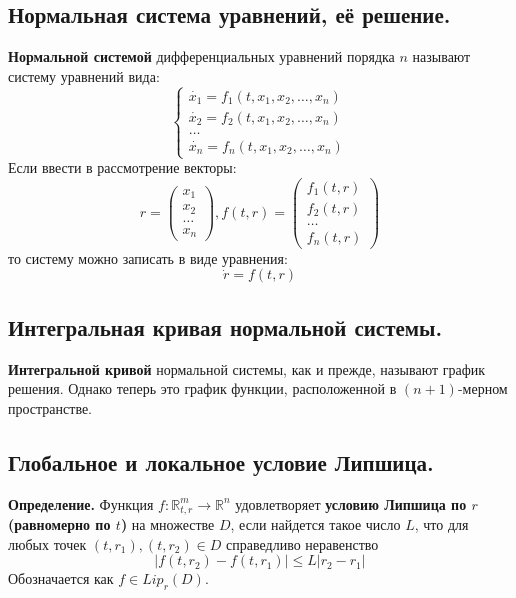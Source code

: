 \documentclass{article}
\begin{document}
\subsection{Нормальная система уравнений, её решение.}
\textbf{Нормальной системой} дифференциальных уравнений порядка $n$ называют систему уравнений вида: 
\begin{equation*}
    \begin{cases}
        \dot{x_1} = f_1(t, x_1, x_2, \ldots, x_n)\\
        \dot{x_2} = f_2(t, x_1, x_2, \ldots, x_n)\\
        \ldots\\
        \dot{x_n} = f_n(t, x_1, x_2, \ldots, x_n)
    \end{cases}
\end{equation*}
Если ввести в рассмотрение векторы:
\begin{equation*}
    r=
    \begin{pmatrix}
    x_1\\
    x_2\\
    \ldots\\
    x_n
    \end{pmatrix},
    f(t, r) =
    \begin{pmatrix}
    f_1(t, r)\\
    f_2(t, r)\\
    \ldots\\
    f_n(t, r)
    \end{pmatrix}
\end{equation*}
то систему можно записать в виде уравнения:
\begin{equation*}
    \dot{r} = f(t, r)
\end{equation*}

\subsection{Интегральная кривая нормальной системы.}
\textbf{Интегральной кривой} нормальной системы, как и прежде, называют график решения. Однако теперь это график функции, расположенной в $(n+1)$-мерном пространстве.

\subsection{Глобальное и локальное условие Липшица.}
\textbf{Определение.} Функция $f: \mathbb{R}_{t,r}^{m} \to \mathbb{R}^n$ удовлетворяет \textbf{условию Липшица по $r$ (равномерно по $t$)} на множестве $D$, если найдется такое число $L$, что для любых точек $(t,r_1), (t,r_2) \in D$ справедливо неравенство \begin{equation*}
    |f(t,r_2) - f(t,r_1)| \le L|r_2 - r_1|
\end{equation*}
Обозначается как $f \in Lip_r(D)$.\\
\end{document}
